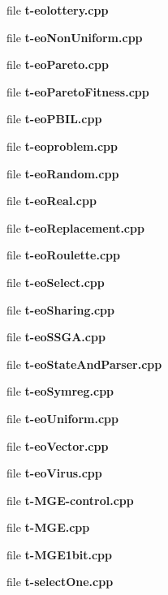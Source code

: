 \begin{CompactItemize}
file {\bf t-eolottery.cpp}
\item 
file {\bf t-eoNonUniform.cpp}
\item 
file {\bf t-eoPareto.cpp}
\item 
file {\bf t-eoParetoFitness.cpp}
\item 
file {\bf t-eoPBIL.cpp}
\item 
file {\bf t-eoproblem.cpp}
\item 
file {\bf t-eoRandom.cpp}
\item 
file {\bf t-eoReal.cpp}
\item 
file {\bf t-eoReplacement.cpp}
\item 
file {\bf t-eoRoulette.cpp}
\item 
file {\bf t-eoSelect.cpp}
\item 
file {\bf t-eoSharing.cpp}
\item 
file {\bf t-eoSSGA.cpp}
\item 
file {\bf t-eoStateAndParser.cpp}
\item 
file {\bf t-eoSymreg.cpp}
\item 
file {\bf t-eoUniform.cpp}
\item 
file {\bf t-eoVector.cpp}
\item 
file {\bf t-eoVirus.cpp}
\item 
file {\bf t-MGE-control.cpp}
\item 
file {\bf t-MGE.cpp}
\item 
file {\bf t-MGE1bit.cpp}
\item 
file {\bf t-selectOne.cpp}
\end{CompactItemize}

